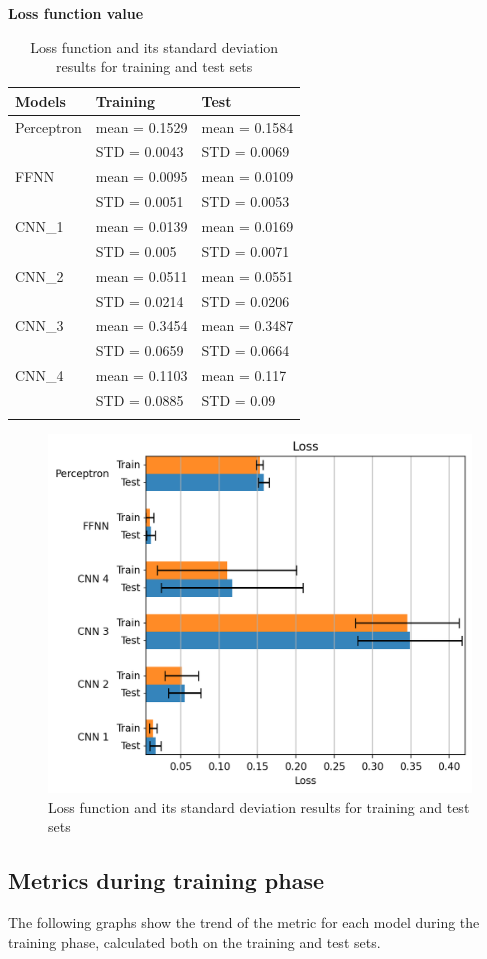 \textbf{Loss function value}
\begin{longtable}[]{@{}lll@{}}
	\toprule
	\textbf{Models} & \textbf{Training} & \textbf{Test}\tabularnewline
	\midrule
	\endhead
	Perceptron & mean = 0.1529 & mean = 0.1584\tabularnewline
	& STD = 0.0043 & STD = 0.0069\tabularnewline
	FFNN & mean = 0.0095 & mean = 0.0109\tabularnewline
	& STD = 0.0051 & STD = 0.0053\tabularnewline
	CNN\_1 & mean = 0.0139 & mean = 0.0169\tabularnewline
	& STD = 0.005 & STD = 0.0071\tabularnewline
	CNN\_2 & mean = 0.0511 & mean = 0.0551\tabularnewline
	& STD = 0.0214 & STD = 0.0206\tabularnewline
	CNN\_3 & mean = 0.3454 & mean = 0.3487\tabularnewline
	& STD = 0.0659 & STD = 0.0664\tabularnewline
	CNN\_4 & mean = 0.1103 & mean = 0.117\tabularnewline
	& STD = 0.0885 & STD = 0.09\tabularnewline
	\bottomrule
	\caption{Loss function and its standard deviation results for training and test sets}
\end{longtable}



\begin{figure}[h!]
\centering
\includegraphics[width=0.85\linewidth]{../images/loss.png}
\caption{Loss function and its standard deviation results for training and test sets}
\end{figure}

\subsection{Metrics during training phase}\label{header-n613}

The following graphs show the trend of the metric for each model during
the training phase, calculated both on the training and test sets.

